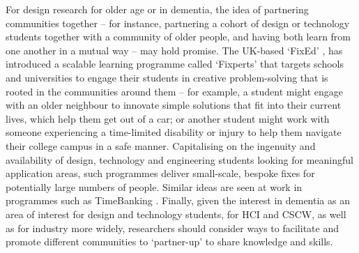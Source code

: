 For design research for older age or in dementia, the idea of partnering communities together – for instance, partnering a cohort of design or technology students together with a community of older people, and having both learn from one another in a mutual way – may hold promise. The UK-based ‘FixEd’ \citep{noauthor_fixperts_nodate}, has introduced a scalable learning programme called `Fixperts' that targets schools and universities to engage their students in creative problem-solving that is rooted in the communities around them – for example, a student might engage with an older neighbour to innovate simple solutions that fit into their current lives, which help them get out of a car; or another student might work with someone experiencing a time-limited disability or injury to help them navigate their college campus in a safe manner. Capitalising on the ingenuity and availability of design, technology and engineering students looking for meaningful application areas, such programmes deliver small-scale, bespoke fixes for potentially large numbers of people. Similar ideas are seen at work in programmes such as TimeBanking \citep{noauthor_hour_nodate}. Finally, given the interest in dementia as an area of interest for design and technology students, for HCI and CSCW, as well as for industry more widely, researchers should consider ways to facilitate and promote different communities to ‘partner-up’ to share knowledge and skills. 


